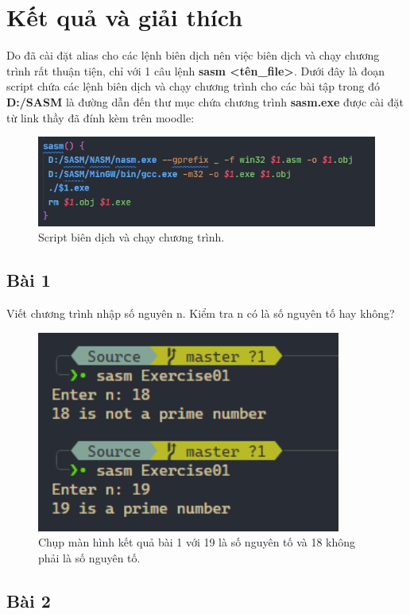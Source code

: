 \newpage
\section{Kết quả và giải thích}
Do đã cài đặt alias cho các lệnh biên dịch nên việc biên dịch và chạy chương trình rất thuận tiện, chỉ với 1 câu lệnh \textbf{sasm <tên\_file>}. Dưới đây là đoạn script chứa các lệnh biên dịch và chạy chương trình cho các bài tập trong đó \textbf{D:/SASM} là đường dẫn đến thư mục chứa chương trình \textbf{sasm.exe} được cài đặt từ link thầy đã đính kèm trên moodle:
\begin{figure}[H]
	\centering
	\includegraphics[width=\textwidth]{images/img0.PNG}
	\caption{Script biên dịch và chạy chương trình.}
\end{figure}
\subsection{Bài 1}
Viết chương trình nhập số nguyên n. Kiểm tra n có là số nguyên tố hay không?


\begin{figure}[H]
	\centering
	\includegraphics[width=10cm]{images/img1.PNG}
	\caption{Chụp màn hình kết quả bài 1 với 19 là số nguyên tố và 18 không phải là số nguyên tố.}
\end{figure}

\subsection{Bài 2}

